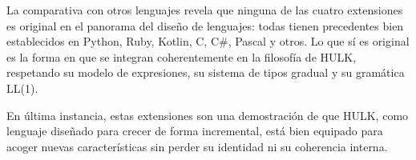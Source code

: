 \documentclass[12pt, a4paper]{article}
\begin{document}
La comparativa con otros lenguajes revela que ninguna de las cuatro extensiones es original en el panorama del diseño de lenguajes: todas tienen precedentes bien establecidos en Python, Ruby, Kotlin, C, C\#, Pascal y otros. Lo que sí es original es la forma en que se integran coherentemente en la filosofía de HULK, respetando su modelo de expresiones, su sistema de tipos gradual y su gramática LL(1).

En última instancia, estas extensiones son una demostración de que HULK, como lenguaje diseñado para crecer de forma incremental, está bien equipado para acoger nuevas características sin perder su identidad ni su coherencia interna.
\end{document}
